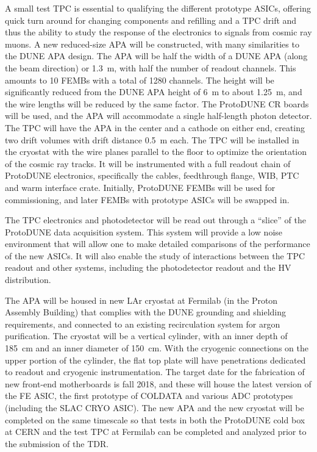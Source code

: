 A small test TPC is essential to qualifying the different prototype ASICs, offering quick turn around for changing components and refilling and a TPC drift and thus the ability to study the response of the electronics to signals from cosmic ray muons.  
A new reduced-size APA will be constructed, with many similarities to the DUNE APA design.  The APA will be half the width of a DUNE APA (along the beam direction) or 1.3~m, with half the number of readout channels.  This amounts to 10 FEMBs with a total of 1280 channels.
The height will be significantly reduced from the DUNE APA height of 6~m to about 1.25~m, and the wire lengths will be reduced by the same factor.  The ProtoDUNE CR boards will be used, and 
 the APA will accommodate a single half-length photon detector.  The TPC will have the APA in the center and a cathode on either end, creating two drift volumes with drift distance 0.5~m each.  The TPC will be installed in the cryostat with the wire planes parallel to the floor to optimize the orientation of the cosmic ray tracks.
 It will be instrumented with a full readout chain of ProtoDUNE electronics, specifically  the cables, feedthrough flange, WIB, PTC and warm interface crate.  Initially, ProtoDUNE FEMBs will be used for commissioning, and later FEMBs with prototype ASICs will be swapped in.

The TPC electronics and photodetector will be read out through a ``slice'' of the ProtoDUNE data acquisition system.  This system will provide a low noise environment that will allow one to make detailed comparisons of the performance of the new ASICs. It will also enable the study of interactions between the TPC readout and other systems, including the photodetector readout and the HV distribution.
 
The APA will be housed in new LAr cryostat at Fermilab (in the Proton Assembly Building) that complies with the DUNE grounding and shielding requirements, and connected to an existing recirculation system for argon purification.  The cryostat will be a vertical cylinder, with an inner depth of 185~cm and an inner diameter of 150~cm.  With the cryogenic connections on the upper portion of the cylinder, the flat top plate will have penetrations dedicated to readout and cryogenic instrumentation.  The target date for the fabrication of new front-end motherboards is fall 2018, and these will house the latest version of the FE ASIC, the first prototype of COLDATA and various ADC prototypes (including the SLAC CRYO ASIC).   The new APA and the new cryostat will be completed on the same timescale so that tests in both the ProtoDUNE cold box at CERN and the test TPC at Fermilab can be completed and analyzed prior to the submission of the TDR.  
